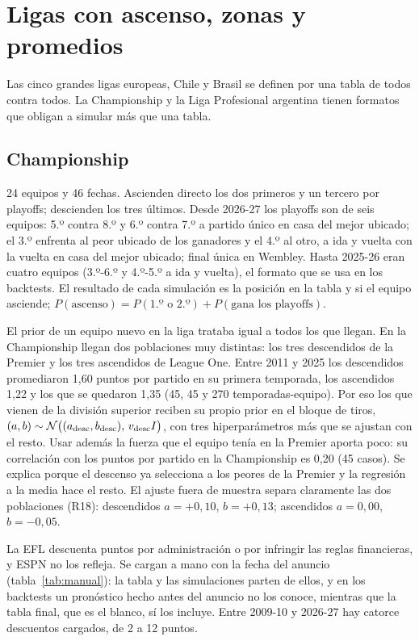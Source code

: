 \chapter{Ligas con ascenso, zonas y promedios}
\label{cap:formatos}

Las cinco grandes ligas europeas, Chile y Brasil se definen por una tabla de todos contra todos. La Championship y la Liga Profesional argentina tienen formatos que obligan a simular más que una tabla.

\section{Championship}
\label{sec:champ}

 24 equipos y 46 fechas. Ascienden directo los dos primeros y un tercero por playoffs; descienden los tres últimos. Desde 2026-27 los playoffs son de seis equipos: 5.º contra 8.º y 6.º contra 7.º a partido único en casa del mejor ubicado; el 3.º enfrenta al peor ubicado de los ganadores y el 4.º al otro, a ida y vuelta con la vuelta en casa del mejor ubicado; final única en Wembley. Hasta 2025-26 eran cuatro equipos (3.º-6.º y 4.º-5.º a ida y vuelta), el formato que se usa en los backtests. El resultado de cada simulación es la posición en la tabla y si el equipo asciende; $P(\text{ascenso})=P(\text{1.º o 2.º})+P(\text{gana los playoffs})$.

 \conj El prior de un equipo nuevo en la liga trataba igual a todos los que llegan. En la Championship llegan dos poblaciones muy distintas: los tres descendidos de la Premier y los tres ascendidos de League One. Entre 2011 y 2025 los descendidos promediaron 1,60 puntos por partido en su primera temporada, los ascendidos 1,22 y los que se quedaron 1,35 (45, 45 y 270 temporadas-equipo). Por eso los que vienen de la división superior reciben su propio prior en el bloque de tiros, $(a,b)\sim\mathcal{N}\big((a_\text{desc},b_\text{desc}),\,v_\text{desc}I\big)$, con tres hiperparámetros más que se ajustan con el resto. Usar además la fuerza que el equipo tenía en la Premier aporta poco: su correlación con los puntos por partido en la Championship es 0,20 (45 casos). Se explica porque el descenso ya selecciona a los peores de la Premier y la regresión a la media hace el resto. El ajuste fuera de muestra separa claramente las dos poblaciones (R18): descendidos $a=+0{,}10$, $b=+0{,}13$; ascendidos $a=0{,}00$, $b=-0{,}05$.

 La EFL descuenta puntos por administración o por infringir las reglas financieras, y ESPN no los refleja. Se cargan a mano con la fecha del anuncio (tabla~\ref{tab:manual}): la tabla y las simulaciones parten de ellos, y en los backtests un pronóstico hecho antes del anuncio no los conoce, mientras que la tabla final, que es el blanco, sí los incluye. Entre 2009-10 y 2026-27 hay catorce descuentos cargados, de 2 a 12 puntos.

